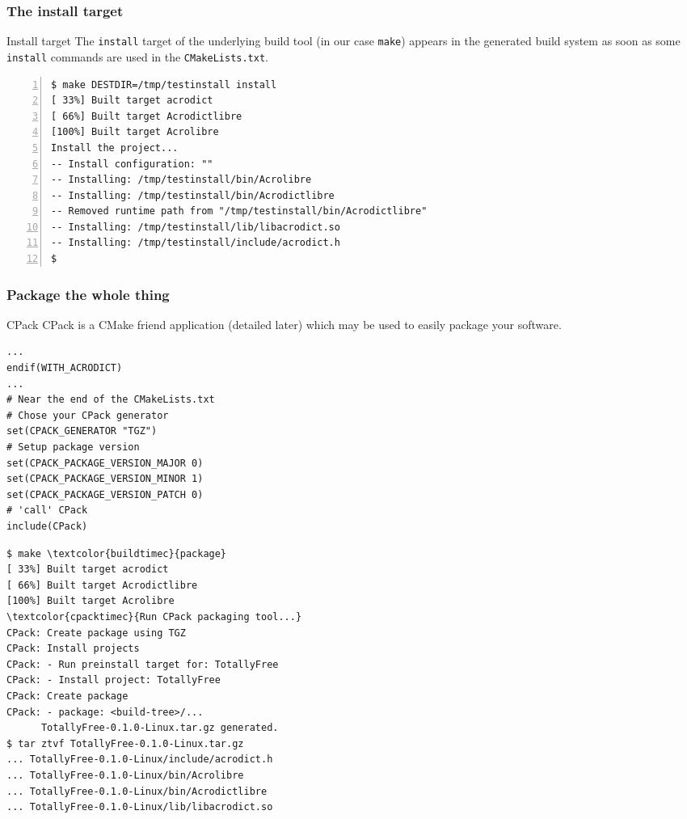 \documentclass[compress,slidestop,table
              ]
               {beamer}
\newcommand{\fname}[1]{\texttt{#1}}
\begin{document}
\begin{frame}[fragile]
\frametitle{The install target}
\begin{block}{Install target}
The \fname{install} target of the underlying build tool (in our case \fname{make})
appears in the generated build system as soon as some \lstinline!install! 
commands are used in the \fname{CMakeLists.txt}.
\end{block}
\begin{Verbatim}[commandchars=\\\{\},fontsize=\scriptsize,numbers=left]
$ make DESTDIR=/tmp/testinstall install
[ 33%] Built target acrodict
[ 66%] Built target Acrodictlibre
[100%] Built target Acrolibre
Install the project...
-- Install configuration: ""
-- Installing: /tmp/testinstall/bin/Acrolibre
-- Installing: /tmp/testinstall/bin/Acrodictlibre
-- Removed runtime path from "/tmp/testinstall/bin/Acrodictlibre"
-- Installing: /tmp/testinstall/lib/libacrodict.so
-- Installing: /tmp/testinstall/include/acrodict.h
$
\end{Verbatim}
\end{frame}

\begin{frame}[fragile]
\frametitle{Package the whole thing}
\vspace*{-0.4cm}
\begin{block}{CPack}
CPack is a CMake friend application (detailed later) which may be used to
easily package your software.
\end{block}
\vspace*{-0.7cm}
\begin{multicols}{2}
\begin{lstlisting}[basicstyle=\tiny,caption=add CPack support,]
...
endif(WITH_ACRODICT)
...
# Near the end of the CMakeLists.txt
# Chose your CPack generator
set(CPACK_GENERATOR "TGZ")
# Setup package version
set(CPACK_PACKAGE_VERSION_MAJOR 0)
set(CPACK_PACKAGE_VERSION_MINOR 1)
set(CPACK_PACKAGE_VERSION_PATCH 0)
# 'call' CPack
include(CPack)
\end{lstlisting}
\columnbreak
\begin{Verbatim}[commandchars=\\\{\},fontsize=\tiny]
$ make \textcolor{buildtimec}{package}
[ 33%] Built target acrodict
[ 66%] Built target Acrodictlibre
[100%] Built target Acrolibre
\textcolor{cpacktimec}{Run CPack packaging tool...}
CPack: Create package using TGZ
CPack: Install projects
CPack: - Run preinstall target for: TotallyFree
CPack: - Install project: TotallyFree
CPack: Create package
CPack: - package: <build-tree>/...
      TotallyFree-0.1.0-Linux.tar.gz generated.
$ tar ztvf TotallyFree-0.1.0-Linux.tar.gz
... TotallyFree-0.1.0-Linux/include/acrodict.h
... TotallyFree-0.1.0-Linux/bin/Acrolibre
... TotallyFree-0.1.0-Linux/bin/Acrodictlibre
... TotallyFree-0.1.0-Linux/lib/libacrodict.so
\end{Verbatim}
\end{multicols}
\end{frame}
\end{document}
